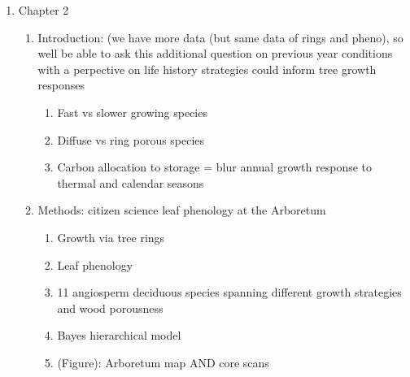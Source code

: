 \documentclass{article}\usepackage[]{graphicx}\usepackage[]{xcolor}
\begin{document}
\begin{enumerate}
\begin{enumerate}
  \item R/D: EOS $>$ SOS; 
    \begin{enumerate}
    \item EOS temperature higher temperature than SOS 
    \item EOS delayed less, but contribution is higher because days are warmer
    \item Suggests looking more at EOS than SOS
    \item (Figure): 2 pannel mu plot for EOS and SOS AND conceptual figure showing GDD differences at EOS and SOS
    \end{enumerate}
  
  \item R/D: No provenance effect; 
    \begin{enumerate}
    \item In this small climatic gradient and range, no evidence of local adaptation on growth
    \item Transition from juvenile to mature trees
    \item (Figure): provenance mu plot
    \end{enumerate}
    
  \end{enumerate}

\item Chapter 2
  \begin{enumerate}
  \item Introduction: (we have more data (but same data of rings and pheno), so well be able to ask this additional question on previous year conditions with a perpective on life history strategies could inform tree growth responses
    \begin{enumerate}
    \item Fast vs slower growing species
    \item Diffuse vs ring porous species
    \item Carbon allocation to storage = blur annual growth response to thermal and calendar seasons
    \end{enumerate}

  \item Methods: citizen science leaf phenology at the Arboretum
    \begin{enumerate}
    \item Growth via tree rings 
    \item Leaf phenology 
    \item 11 angiosperm deciduous species spanning different growth strategies and wood porousness
    \item Bayes hierarchical model
    \item (Figure): Arboretum map AND core scans
    \end{enumerate}
    

\end{enumerate}
\end{enumerate}
\end{document}
